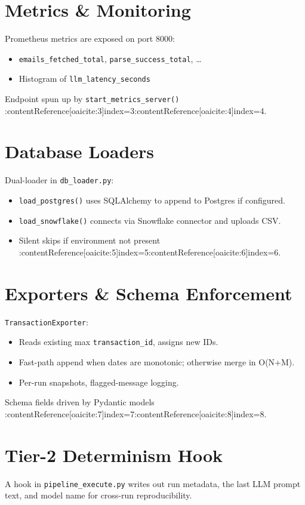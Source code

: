 \documentclass{article}
\begin{document}
	\section{Metrics \& Monitoring}
	Prometheus metrics are exposed on port 8000:
	\begin{itemize}
		\item \texttt{emails\_fetched\_total}, \texttt{parse\_success\_total}, \ldots  
		\item Histogram of \texttt{llm\_latency\_seconds}  
	\end{itemize}
	Endpoint spun up by \texttt{start\_metrics\_server()} :contentReference[oaicite:3]{index=3}:contentReference[oaicite:4]{index=4}.
	
	\section{Database Loaders}
	Dual-loader in \texttt{db\_loader.py}:
	\begin{itemize}
		\item \texttt{load\_postgres()} uses SQLAlchemy to append to Postgres if configured.  
		\item \texttt{load\_snowflake()} connects via Snowflake connector and uploads CSV.  
		\item Silent skips if environment not present :contentReference[oaicite:5]{index=5}:contentReference[oaicite:6]{index=6}.
	\end{itemize}
	
	\section{Exporters \& Schema Enforcement}
	\texttt{TransactionExporter}:
	\begin{itemize}
		\item Reads existing max \texttt{transaction\_id}, assigns new IDs.  
		\item Fast-path append when dates are monotonic; otherwise merge in O(N+M).  
		\item Per-run snapshots, flagged-message logging.  
	\end{itemize}
	Schema fields driven by Pydantic models :contentReference[oaicite:7]{index=7}:contentReference[oaicite:8]{index=8}.
	
	\section{Tier-2 Determinism Hook}
	A hook in \texttt{pipeline\_execute.py} writes out run metadata, the last LLM prompt text, and model name for cross-run reproducibility.
	
\end{document}
